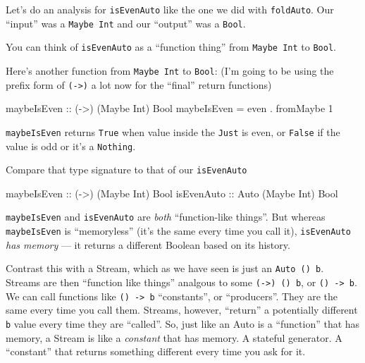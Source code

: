 \documentclass[]{article}
\newenvironment{Shaded}{}{}
\newcommand{\DataTypeTok}[1]{\textcolor[rgb]{0.56,0.13,0.00}{{#1}}}
\newcommand{\DecValTok}[1]{\textcolor[rgb]{0.25,0.63,0.44}{{#1}}}
\newcommand{\OtherTok}[1]{\textcolor[rgb]{0.00,0.44,0.13}{{#1}}}
\newcommand{\FunctionTok}[1]{\textcolor[rgb]{0.02,0.16,0.49}{{#1}}}
\newcommand{\NormalTok}[1]{{#1}}
\begin{document}
Let's do an analysis for \texttt{isEvenAuto} like the one we did with
\texttt{foldAuto}. Our ``input'' was a \texttt{Maybe\ Int} and our
``output'' was a \texttt{Bool}.

You can think of \texttt{isEvenAuto} as a ``function thing'' from
\texttt{Maybe\ Int} to \texttt{Bool}.

Here's another function from \texttt{Maybe\ Int} to \texttt{Bool}: (I'm
going to be using the prefix form of \texttt{(-\textgreater{})} a lot
now for the ``final'' return functions)

\begin{Shaded}
\begin{Highlighting}[]
\OtherTok{maybeIsEven ::} \NormalTok{(}\OtherTok{->}\NormalTok{) (}\DataTypeTok{Maybe} \DataTypeTok{Int}\NormalTok{) }\DataTypeTok{Bool}
\NormalTok{maybeIsEven }\FunctionTok{=} \NormalTok{even }\FunctionTok{.} \NormalTok{fromMaybe }\DecValTok{1}
\end{Highlighting}
\end{Shaded}

\texttt{maybeIsEven} returns \texttt{True} when value inside the
\texttt{Just} is even, or \texttt{False} if the value is odd or it's a
\texttt{Nothing}.

Compare that type signature to that of our \texttt{isEvenAuto}

\begin{Shaded}
\begin{Highlighting}[]
\OtherTok{maybeIsEven ::} \NormalTok{(}\OtherTok{->}\NormalTok{) (}\DataTypeTok{Maybe} \DataTypeTok{Int}\NormalTok{) }\DataTypeTok{Bool}
\OtherTok{isEvenAuto  ::} \DataTypeTok{Auto} \NormalTok{(}\DataTypeTok{Maybe} \DataTypeTok{Int}\NormalTok{) }\DataTypeTok{Bool}
\end{Highlighting}
\end{Shaded}

\texttt{maybeIsEven} and \texttt{isEvenAuto} are \emph{both}
``function-like things''. But whereas \texttt{maybeIsEven} is
``memoryless'' (it's the same every time you call it),
\texttt{isEvenAuto} \emph{has memory} --- it returns a different Boolean
based on its history.

Contrast this with a Stream, which as we have seen is just an
\texttt{Auto\ ()\ b}. Streams are then ``function like things'' analgous
to some \texttt{(-\textgreater{})\ ()\ b}, or
\texttt{()\ -\textgreater{}\ b}. We can call functions like
\texttt{()\ -\textgreater{}\ b} ``constants'', or ``producers''. They
are the same every time you call them. Streams, however, ``return'' a
potentially different \texttt{b} value every time they are ``called''.
So, just like an Auto is a ``function'' that has memory, a Stream is
like a \emph{constant} that has memory. A stateful generator. A
``constant'' that returns something different every time you ask for it.
\end{document}
